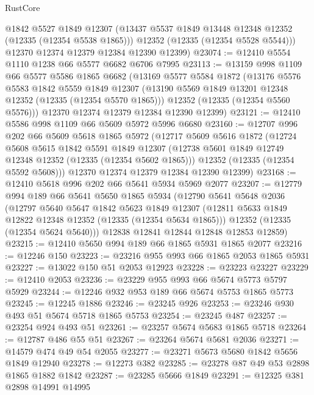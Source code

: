 \begin{lexlean}{RustCore}
\begin{coremodule}
        @1842
        @5527
        @1849
        @12307
        (@13437 @5537 @1849 @13448 @12348 @12352 (@12335 (@12354 @5538 @1865)))
        @12352
        (@12335 (@12354 @5528 @5544)))
      @12370
      @12374
      @12379
      @12384
      @12390
      @12399)
@23074 := @12410 @5554 @1110 @1238 @66 @5577 @6682 @6706 @7995
@23113 := @13159
    @998
    @1109
    @66
    @5577
    @5586
    @1865
    @6682
    (@13169
      @5577
      @5584
      @1872
      (@13176
        @5576
        @5583
        @1842
        @5559
        @1849
        @12307
        (@13190 @5569 @1849 @13201 @12348 @12352 (@12335 (@12354 @5570 @1865)))
        @12352
        (@12335 (@12354 @5560 @5576)))
      @12370
      @12374
      @12379
      @12384
      @12390
      @12399)
@23121 := @12410 @5586 @998 @1109 @66 @5609 @5972 @5996 @6680
@23160 := @12707
    @996
    @202
    @66
    @5609
    @5618
    @1865
    @5972
    (@12717
      @5609
      @5616
      @1872
      (@12724
        @5608
        @5615
        @1842
        @5591
        @1849
        @12307
        (@12738 @5601 @1849 @12749 @12348 @12352 (@12335 (@12354 @5602 @1865)))
        @12352
        (@12335 (@12354 @5592 @5608)))
      @12370
      @12374
      @12379
      @12384
      @12390
      @12399)
@23168 := @12410 @5618 @996 @202 @66 @5641 @5934 @5969 @2077
@23207 := @12779
    @994
    @189
    @66
    @5641
    @5650
    @1865
    @5934
    (@12790
      @5641
      @5648
      @2036
      (@12797
        @5640
        @5647
        @1842
        @5623
        @1849
        @12307
        (@12811 @5633 @1849 @12822 @12348 @12352 (@12335 (@12354 @5634 @1865)))
        @12352
        (@12335 (@12354 @5624 @5640)))
      @12838
      @12841
      @12844
      @12848
      @12853
      @12859)
@23215 := @12410 @5650 @994 @189 @66 @1865 @5931 @1865 @2077
@23216 := @12246 @150
@23223 := @23216 @955 @993 @66 @1865 @2053 @1865 @5931
@23227 := @13022 @150 @51 @2053 @12923
@23228 := @23223 @23227
@23229 := @12410 @2053
@23236 := @23229 @955 @993 @66 @5674 @5773 @5797 @5929
@23244 := @12246 @932 @953 @189 @66 @5674 @5753 @1865 @5773
@23245 := @12245 @1886
@23246 := @23245 @926
@23253 := @23246 @930 @493 @51 @5674 @5718 @1865 @5753
@23254 := @23245 @487
@23257 := @23254 @924 @493 @51
@23261 := @23257 @5674 @5683 @1865 @5718
@23264 := @12787 @486 @55 @51
@23267 := @23264 @5674 @5681 @2036
@23271 := @14579 @474 @49 @54 @2055
@23277 := @23271 @5673 @5680 @1842 @5656 @1849 @12940
@23278 := @12273 @382
@23285 := @23278 @87 @49 @53 @2898 @1865 @1882 @1842
@23287 := @23285 @5666 @1849
@23291 := @12325 @381 @2898 @14991 @14995

\end{coremodule}
\end{lexlean}
